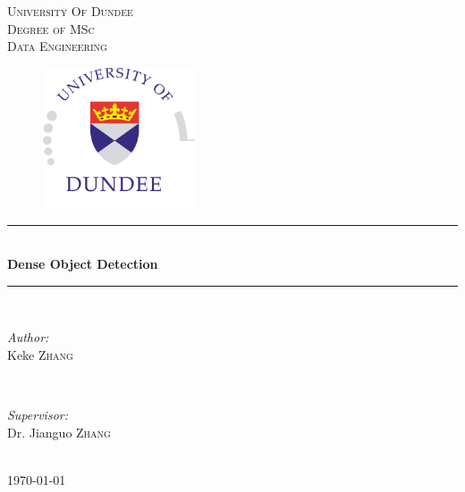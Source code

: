 \documentclass[12pt,a4paper]{report}
\begin{document}
\begin{titlepage}

\newcommand{\HRule}{\rule{\linewidth}{0.5mm}} 

\center 
 
\textsc{\LARGE University Of Dundee}\\[1.5cm] %
\textsc{\Large Degree of MSc}\\[0.5cm] %
\textsc{\large Data Engineering}\\[0.5cm] %


\begin{figure}
\centering
\includegraphics[width=0.4\textwidth]{dundee.jpg}
\end{figure}

\HRule \\[0.4cm]
{ \huge \bfseries Dense Object Detection}\\[0.4cm] %
\HRule \\[1.5cm]
 
\begin{minipage}{0.4\textwidth}
\begin{flushleft} \large
\emph{Author:}\\
Keke \textsc{Zhang} %
\end{flushleft}
\end{minipage}
~
\begin{minipage}{0.4\textwidth}
\begin{flushright} \large
\emph{Supervisor:} \\
Dr. Jianguo \textsc{Zhang}
\end{flushright}
\end{minipage}\\[4cm]

{\large \today}\\[3cm] 


\vfill 

\end{titlepage}
\newpage
\end{document}
